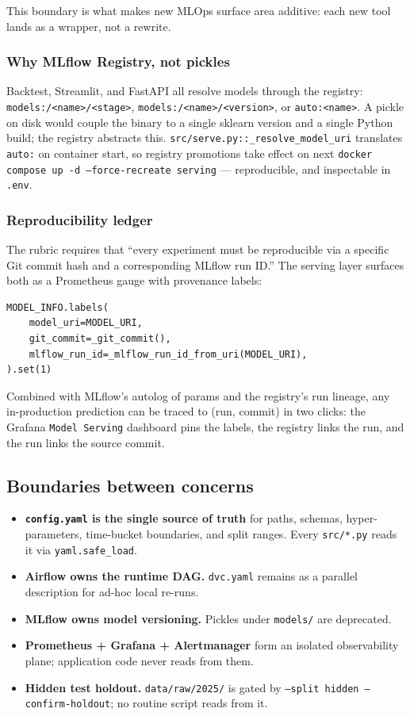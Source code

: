 \documentclass[11pt,a4paper]{article}
\begin{document}
This boundary is what makes new MLOps surface area additive: each new tool lands as a wrapper, not a rewrite.

\subsubsection{Why MLflow Registry, not pickles}
Backtest, Streamlit, and FastAPI all resolve models through the registry: \texttt{models:/<name>/<stage>}, \texttt{models:/<name>/<version>}, or \texttt{auto:<name>}. A pickle on disk would couple the binary to a single sklearn version and a single Python build; the registry abstracts this. \texttt{src/serve.py::\_resolve\_model\_uri} translates \texttt{auto:} on container start, so registry promotions take effect on next \texttt{docker compose up -d --force-recreate serving} --- reproducible, and inspectable in \texttt{.env}.

\subsubsection{Reproducibility ledger}
The rubric requires that ``every experiment must be reproducible via a specific Git commit hash and a corresponding MLflow run ID.'' The serving layer surfaces both as a Prometheus gauge with provenance labels:

\begin{lstlisting}[style=pystyle]
MODEL_INFO.labels(
    model_uri=MODEL_URI,
    git_commit=_git_commit(),
    mlflow_run_id=_mlflow_run_id_from_uri(MODEL_URI),
).set(1)
\end{lstlisting}

Combined with MLflow's autolog of params and the registry's run lineage, any in-production prediction can be traced to (run, commit) in two clicks: the Grafana \texttt{Model Serving} dashboard pins the labels, the registry links the run, and the run links the source commit.

\subsection{Boundaries between concerns}

\begin{itemize}[leftmargin=1.5em,itemsep=0pt]
  \item \textbf{\texttt{config.yaml} is the single source of truth} for paths, schemas, hyper-parameters, time-bucket boundaries, and split ranges. Every \texttt{src/*.py} reads it via \texttt{yaml.safe\_load}.
  \item \textbf{Airflow owns the runtime DAG.} \texttt{dvc.yaml} remains as a parallel description for ad-hoc local re-runs.
  \item \textbf{MLflow owns model versioning.} Pickles under \texttt{models/} are deprecated.
  \item \textbf{Prometheus + Grafana + Alertmanager} form an isolated observability plane; application code never reads from them.
  \item \textbf{Hidden test holdout.} \texttt{data/raw/2025/} is gated by \texttt{--split hidden --confirm-holdout}; no routine script reads from it.
\end{itemize}
\end{document}
